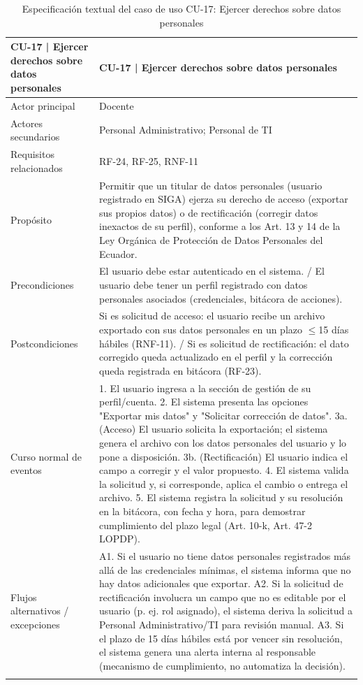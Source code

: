 
\begingroup
\small
\begin{longtable}{|p{7.8cm}|p{7.8cm}|}
\hline
CU-17 | Ejercer derechos sobre datos personales & CU-17 | Ejercer derechos sobre datos personales \\ \hline
Actor principal & Docente \\ \hline
Actores secundarios & Personal Administrativo; Personal de TI \\ \hline
Requisitos relacionados & RF-24, RF-25, RNF-11 \\ \hline
Propósito & Permitir que un titular de datos personales (usuario registrado en SIGA) ejerza su derecho de acceso (exportar sus propios datos) o de rectificación (corregir datos inexactos de su perfil), conforme a los Art. 13 y 14 de la Ley Orgánica de Protección de Datos Personales del Ecuador. \\ \hline
Precondiciones & El usuario debe estar autenticado en el sistema. / El usuario debe tener un perfil registrado con datos personales asociados (credenciales, bitácora de acciones). \\ \hline
Postcondiciones & Si es solicitud de acceso: el usuario recibe un archivo exportado con sus datos personales en un plazo $\leq$15 días hábiles (RNF-11). / Si es solicitud de rectificación: el dato corregido queda actualizado en el perfil y la corrección queda registrada en bitácora (RF-23). \\ \hline
Curso normal de eventos & 1. El usuario ingresa a la sección de gestión de su perfil/cuenta. 2. El sistema presenta las opciones "Exportar mis datos" y "Solicitar corrección de datos". 3a. (Acceso) El usuario solicita la exportación; el sistema genera el archivo con los datos personales del usuario y lo pone a disposición. 3b. (Rectificación) El usuario indica el campo a corregir y el valor propuesto. 4. El sistema valida la solicitud y, si corresponde, aplica el cambio o entrega el archivo. 5. El sistema registra la solicitud y su resolución en la bitácora, con fecha y hora, para demostrar cumplimiento del plazo legal (Art. 10-k, Art. 47-2 LOPDP). \\ \hline
Flujos alternativos / excepciones & A1. Si el usuario no tiene datos personales registrados más allá de las credenciales mínimas, el sistema informa que no hay datos adicionales que exportar. A2. Si la solicitud de rectificación involucra un campo que no es editable por el usuario (p. ej. rol asignado), el sistema deriva la solicitud a Personal Administrativo/TI para revisión manual. A3. Si el plazo de 15 días hábiles está por vencer sin resolución, el sistema genera una alerta interna al responsable (mecanismo de cumplimiento, no automatiza la decisión). \\ \hline
\caption{Especificación textual del caso de uso CU-17: Ejercer derechos sobre datos personales}
\end{longtable}
\endgroup
